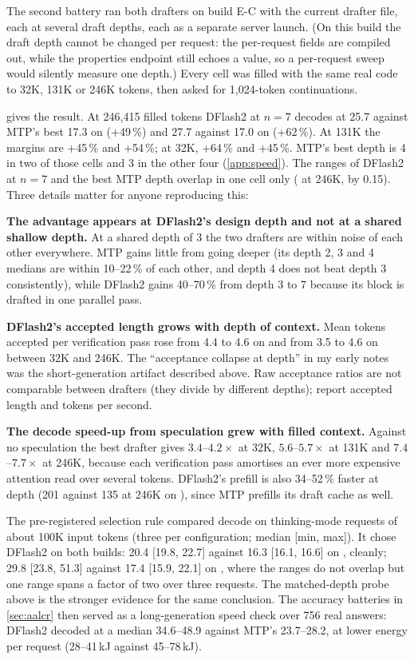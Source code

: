The second battery ran both drafters on build E-C with the current drafter file, each at several draft
depths, each as a separate server launch. (On this build the draft depth cannot be changed per
request: the per-request fields are compiled out, while the properties endpoint still echoes a value,
so a per-request sweep would silently measure one depth.) Every cell was filled with the same real
code to 32K, 131K or 246K tokens, then asked for 1{,}024-token continuations.

 gives the result. At 246{,}415 filled tokens DFlash2 at $n{=}7$ decodes at 25.7
against MTP's best 17.3\tps{} on \Qsix{} (+49\,\%) and 27.7 against 17.0 on \Qfour{} (+62\,\%). At
131K the margins are +45\,\% and +54\,\%; at 32K, +64\,\% and +45\,\%. MTP's best depth is 4 in two of those cells and 3 in the other four (\cref{app:speed}). The ranges of
DFlash2 at $n{=}7$ and the best MTP depth overlap in one cell only (\Qsix{} at 246K, by 0.15\tps).
Three details matter for anyone reproducing this:

\textbf{The advantage appears at DFlash2's design depth and not at a shared shallow depth.} At a shared depth of 3 the two drafters are
within noise of each other everywhere. MTP gains little from going deeper (its depth 2, 3 and 4
medians are within 10--22\,\% of each other, and depth 4 does not beat depth 3 consistently), while DFlash2 gains 40--70\,\% from depth 3 to 7 because
its block is drafted in one parallel pass.

\textbf{DFlash2's accepted length grows with depth of context.} Mean tokens accepted per verification
pass rose from 4.4 to 4.6 on \Qsix{} and from 3.5 to 4.6 on \Qfour{} between 32K and 246K. The
``acceptance collapse at depth'' in my early notes was the short-generation artifact described above.
Raw acceptance ratios are not comparable between drafters (they divide by different depths); report
accepted length and tokens per second.

\textbf{The decode speed-up from speculation grew with filled context.} Against no speculation the best drafter
gives $3.4$--$4.2\times$ at 32K, $5.6$--$5.7\times$ at 131K and $7.4$--$7.7\times$ at 246K, because
each verification pass amortises an ever more expensive attention read over several tokens. DFlash2's
prefill is also 34--52\,\% faster at depth (201 against 135\tps{} at 246K on \Qsix), since MTP
prefills its draft cache as well.

The pre-registered selection rule compared decode on thinking-mode requests of about 100K input tokens
(three per configuration; median [min, max]). It chose DFlash2 on both builds: 20.4 [19.8, 22.7]
against 16.3 [16.1, 16.6]\tps{} on \Qsix, cleanly; 29.8 [23.8, 51.3] against 17.4 [15.9, 22.1] on
\Qfour, where the ranges do not overlap but one range spans a factor of two over three requests. The matched-depth probe above is the stronger evidence for the same conclusion. The
accuracy batteries in \cref{sec:aalcr} then served as a long-generation speed check over 756 real
answers: DFlash2 decoded at a median 34.6--48.9\tps{} against MTP's 23.7--28.2, at lower energy per
request (28--41\,kJ against 45--78\,kJ).

